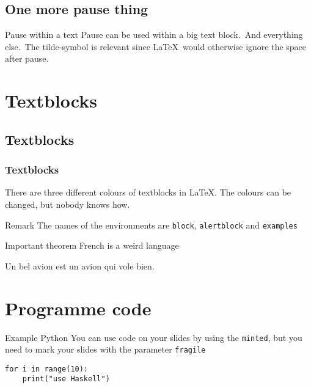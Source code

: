 \subsection*{One more pause thing}
\begin{frame}{Pause within a text}
Pause can be used within a big text block.\pause~And everything else.\pause~The tilde-symbol is relevant since \LaTeX~would otherwise ignore the space after pause.
\end{frame}

\section{Textblocks}
\subsection*{Textblocks}
\begin{frame}
    \frametitle{Textblocks}
    
    There are three different colours of textblocks in \LaTeX. The colours can be changed, but nobody knows how.
    
    \begin{block}{Remark}
    The names of the environments are \texttt{block}, \texttt{alertblock} and \texttt{examples}
    \end{block}
   
    \begin{alertblock}{Important theorem}
    French is a weird language
    \end{alertblock}
    
    \begin{examples}
    Un bel avion est un avion qui vole bien.
    \end{examples}
\end{frame}

\section{Programme code}
\begin{frame}[fragile]{Example Python}
You can use code on your slides by using the \texttt{minted}, but you need to mark your slides with the parameter \texttt{fragile}
\begin{verbatim}
for i in range(10):
    print("use Haskell")
\end{verbatim}
\end{frame}

